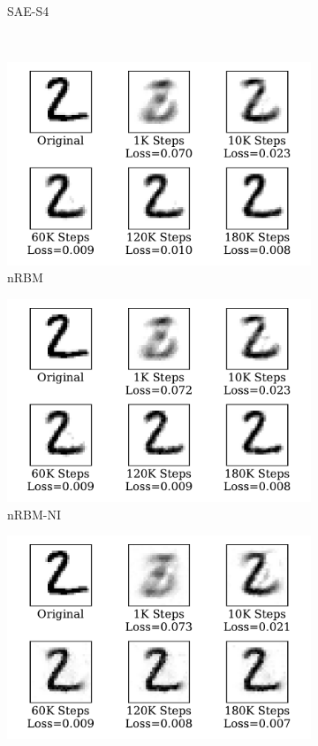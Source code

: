 \begin{figure}
\begin{subfigure}[t]{0.32\textwidth}
		\caption{SAE-S4}
	\end{subfigure}\\
	\begin{subfigure}[t]{0.32\textwidth}
		\includegraphics[width=\textwidth]{pics_sdlm/32_MNIST_RBM/recon_digit.pdf}
		\caption{nRBM}
	\end{subfigure}
	\begin{subfigure}[t]{0.32\textwidth}
		\includegraphics[width=\textwidth]{pics_sdlm/33_MNIST_RBM_noise/recon_digit.pdf}
		\caption{nRBM-NI}
	\end{subfigure}
	\begin{subfigure}[t]{0.32\textwidth}
		\includegraphics[width=\textwidth]{pics_sdlm/50_MNIST_SRBM_original/recon_digit.pdf}

\end{subfigure}
\end{figure}
